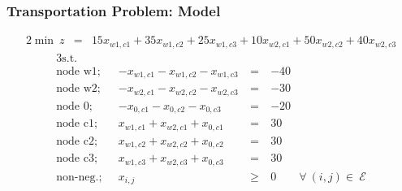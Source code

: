 \documentclass[10pt,handout,notes=show]{beamer}
\begin{document}
\begin{frame}
  \frametitle{Transportation Problem: Model }

  \begin{flushleft}
  \small{
    \begin{alignat*}{2}
    \min\ z     & =& 15x_{w1,c1}+35x_{w1,c2}+25x_{w1,c3} +10x_{w2,c1}+50x_{w2,c2}+40x_{w2,c3}
    \end{alignat*}
    \begin{alignat*}{3}
    \mbox{s.t.} & & & \\
    \mbox{node w1;~~} &  -x_{w1,c1} - x_{w1,c2} - x_{w1,c3} ~&=\ & -40\\
    \mbox{node w2;~~} &  -x_{w2,c1} - x_{w2,c2} - x_{w2,c3} ~&=\ & -30\\
    \mbox{node 0;~~} &  -x_{0,c1} - x_{0,c2} - x_{0,c3} &=\ & -20\\
    \mbox{node c1;~~} &  x_{w1,c1} + x_{w2,c1}+x_{0,c1}  &=\ & 30 \\
    \mbox{node c2;~~} &  x_{w1,c2} + x_{w2,c2}+x_{0,c2}  &=\ & 30 \\
    \mbox{node c3;~~} &  x_{w1,c3} + x_{w2,c3}+x_{0,c3}  &=\ & 30 \\
    \mbox{non-neg.;~~}&  x_{i,j}                            &\geq\ & 0 \qquad \forall\ (i,j) \in\ \mathcal{E}
    \end{alignat*}
  }
  \end{flushleft}

\end{frame}
\end{document}

